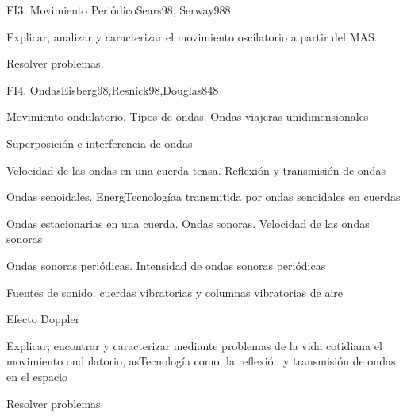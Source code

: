 \begin{syllabus}
\begin{unit}{FI3. Movimiento Periódico}{Sears98, Serway98}{8}
   \begin{unitgoals}
         \item  Explicar, analizar y caracterizar el movimiento oscilatorio a partir del MAS.
         \item  Resolver problemas.
   \end{unitgoals}
\end{unit}

\begin{unit}{FI4. Ondas}{Eisberg98,Resnick98,Douglas84}{8}
\begin{topics}
         \item  Movimiento ondulatorio. Tipos de ondas. Ondas viajeras unidimensionales
	 \item  Superposición e interferencia de ondas
         \item  Velocidad de las ondas en una cuerda tensa. Reflexión y transmisión de ondas
	 \item  Ondas senoidales. EnergTecnologíaa transmitida por ondas senoidales en cuerdas
         \item  Ondas estacionarias en una cuerda. Ondas sonoras. Velocidad de las ondas sonoras
	 \item  Ondas sonoras periódicas. Intensidad de ondas sonoras periódicas
	 \item  Fuentes de sonido: cuerdas vibratorias y columnas vibratorias de aire
	 \item  Efecto Doppler
   \end{topics}

   \begin{unitgoals}
         \item  Explicar, encontrar y caracterizar mediante problemas de la vida cotidiana el movimiento ondulatorio, asTecnología como, la reflexión y transmisión de ondas en el espacio
         \item  Resolver problemas
   \end{unitgoals}
\end{unit}


\end{syllabus}
